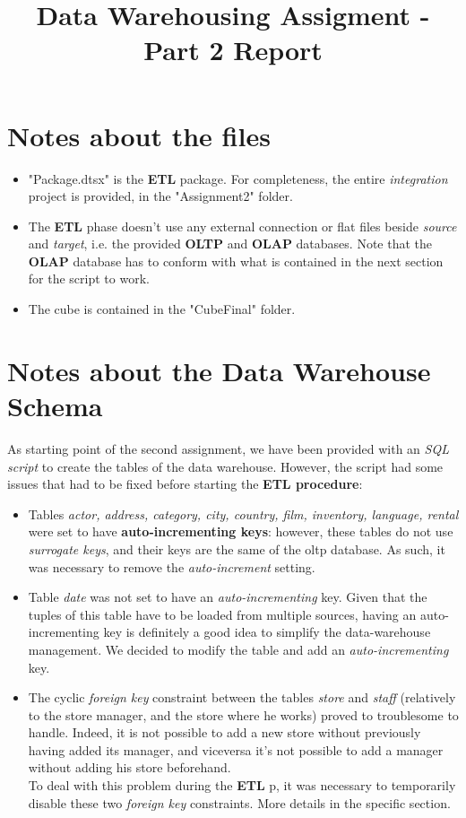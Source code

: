 \documentclass[
10pt,
a4paper,
oneside,
headinclude,
footinclude]{article}
\title{\textbf{Data Warehousing Assigment - Part 2 Report}}
\begin{document}
\maketitle
{}
\setcounter{page}{1}

\section{Notes about the files}
\begin{itemize}
	\item "Package.dtsx" is the \textbf{ETL} package. For completeness, the entire \textit{integration} project is provided, in the "Assignment2" folder.
	\item The \textbf{ETL} phase doesn't use any external connection or flat files beside \textit{source} and \textit{target}, i.e. the provided \textbf{OLTP} and \textbf{OLAP} databases. Note that the \textbf{OLAP} database has to conform with what is contained in the next section for the script to work.
	\item The cube is contained in the "CubeFinal" folder.
\end{itemize}

\section{Notes about the Data Warehouse Schema}
\vspace{-7mm}
As starting point of the second assignment, we have been provided with an \textit{SQL script} to create the tables of the data warehouse. However, the script had some issues that had to be fixed before starting the \textbf{ETL procedure}:
\begin{itemize}
	\item Tables \textit{actor, address, category, city, country, film, inventory, language, rental} were set to have \textbf{auto-incrementing keys}: however, these tables do not use \textit{surrogate keys}, and their keys are the same of the oltp database. As such, it was necessary to remove the \textit{auto-increment} setting.
	
	\item Table \textit{date} was not set to have an \textit{auto-incrementing} key. Given that the tuples of this table have to be loaded from multiple sources, having an auto-incrementing key is definitely a good idea to simplify the data-warehouse management. We decided to modify the table and add an \textit{auto-incrementing} key.
	
	\item The cyclic \textit{foreign key} constraint between the tables \textit{store} and \textit{staff} (relatively to the store manager, and the store where he works) proved to troublesome to handle. Indeed, it is not possible to add a new store without previously having added its manager, and viceversa it's not possible to add a manager without adding his store beforehand.\\
	To deal with this problem during the \textbf{ETL} p, it was necessary to temporarily disable these two \textit{foreign key} constraints. More details in the specific section.
\end{itemize} 
\end{document}
